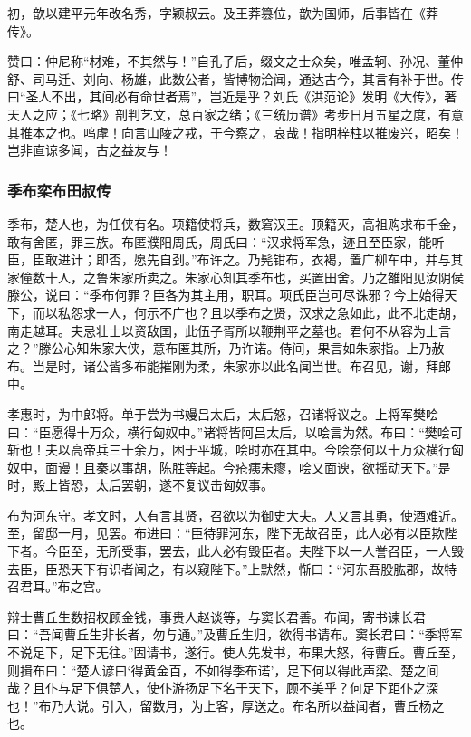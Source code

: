\documentclass[]{article}
\begin{document}
初，歆以建平元年改名秀，字颖叔云。及王莽篡位，歆为国师，后事皆在《莽传》。

赞曰：仲尼称``材难，不其然与！''自孔子后，缀文之士众矣，唯孟轲、孙况、董仲舒、司马迁、刘向、杨雄，此数公者，皆博物洽闻，通达古今，其言有补于世。传曰``圣人不出，其间必有命世者焉''，岂近是乎？刘氏《洪范论》发明《大传》，著天人之应；《七略》剖判艺文，总百家之绪；《三统历谱》考步日月五星之度，有意其推本之也。呜虖！向言山陵之戎，于今察之，哀哉！指明梓柱以推废兴，昭矣！岂非直谅多闻，古之益友与！

\hypertarget{header-n3674}{%
\subsubsection{季布栾布田叔传}\label{header-n3674}}

季布，楚人也，为任侠有名。项籍使将兵，数窘汉王。顶籍灭，高祖购求布千金，敢有舍匿，罪三族。布匿濮阳周氏，周氏曰：``汉求将军急，迹且至臣家，能听臣，臣敢进计；即否，愿先自刭。''布许之。乃髡钳布，衣褐，置广柳车中，并与其家僮数十人，之鲁朱家所卖之。朱家心知其季布也，买置田舍。乃之雒阳见汝阴侯滕公，说曰：``季布何罪？臣各为其主用，职耳。项氏臣岂可尽诛邪？今上始得天下，而以私怨求一人，何示不广也？且以季布之贤，汉求之急如此，此不北走胡，南走越耳。夫忌壮士以资敌国，此伍子胥所以鞭荆平之墓也。君何不从容为上言之？''滕公心知朱家大侠，意布匿其所，乃许诺。侍间，果言如朱家指。上乃赦布。当是时，诸公皆多布能摧刚为柔，朱家亦以此名闻当世。布召见，谢，拜郎中。

孝惠时，为中郎将。单于尝为书嫚吕太后，太后怒，召诸将议之。上将军樊哙曰：``臣愿得十万众，横行匈奴中。''诸将皆阿吕太后，以哙言为然。布曰：``樊哙可斩也！夫以高帝兵三十余万，困于平城，哙时亦在其中。今哙奈何以十万众横行匈奴中，面谩！且秦以事胡，陈胜等起。今疮痍未瘳，哙又面谀，欲摇动天下。''是时，殿上皆恐，太后罢朝，遂不复议击匈奴事。

布为河东守。孝文时，人有言其贤，召欲以为御史大夫。人又言其勇，使酒难近。至，留邸一月，见罢。布进曰：``臣待罪河东，陛下无故召臣，此人必有以臣欺陛下者。今臣至，无所受事，罢去，此人必有毁臣者。夫陛下以一人誉召臣，一人毁去臣，臣恐天下有识者闻之，有以窥陛下。''上默然，惭曰：``河东吾股肱郡，故特召君耳。''布之宫。

辩士曹丘生数招权顾金钱，事贵人赵谈等，与窦长君善。布闻，寄书谏长君曰：``吾闻曹丘生非长者，勿与通。''及曹丘生归，欲得书请布。窦长君曰：``季将军不说足下，足下无往。''固请书，遂行。使人先发书，布果大怒，待曹丘。曹丘至，则揖布曰：``楚人谚曰`得黄金百，不如得季布诺'，足下何以得此声梁、楚之间哉？且仆与足下俱楚人，使仆游扬足下名于天下，顾不美乎？何足下距仆之深也！''布乃大说。引入，留数月，为上客，厚送之。布名所以益闻者，曹丘杨之也。
\end{document}
